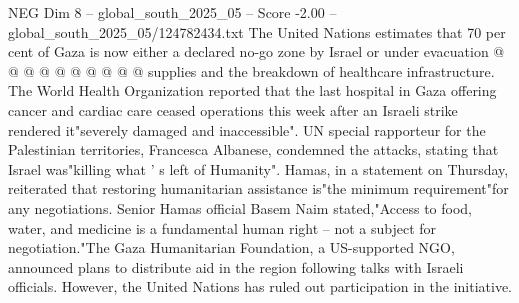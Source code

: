 \begin{textsample}{NEG Dim 8 – global\_south\_2025\_05 – Score -2.00 – global\_south\_2025\_05/124782434.txt}
The United Nations estimates that 70 per cent of Gaza is now either a declared no-go zone by Israel or under evacuation @ @ @ @ @ @ @ @ @ @ supplies and the breakdown of healthcare infrastructure.
The World Health Organization reported that the last hospital in Gaza offering cancer and cardiac care ceased operations this week after an Israeli strike rendered it"severely damaged and inaccessible".
UN special rapporteur for the Palestinian territories, Francesca Albanese, condemned the attacks, stating that Israel was"killing what ' s left of Humanity".
Hamas, in a statement on Thursday, reiterated that restoring humanitarian assistance is"the minimum requirement"for any negotiations.
Senior Hamas official Basem Naim stated,"Access to food, water, and medicine is a fundamental human right -- not a subject for negotiation."The Gaza Humanitarian Foundation, a US-supported NGO, announced plans to distribute aid in the region following talks with Israeli officials.
However, the United Nations has ruled out participation in the initiative.

\end{textsample}
